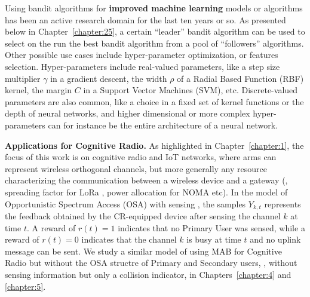    Using bandit algorithms for \textbf{improved machine learning} models or algorithms has been an active research domain for the last ten years or so.
    As presented below in Chapter~\ref{chapter:25}, a certain ``leader'' bandit algorithm can be used to select on the run the best bandit algorithm from a pool of ``followers'' algorithms.
    Other possible use cases include hyper-parameter optimization, or features selection.
    Hyper-parameters include real-valued parameters,
    like a step size multiplier $\gamma$ in a gradient descent,
    the width $\rho$ of a Radial Based Function (RBF) kernel,
    the margin $C$ in a Support Vector Machines (SVM), etc.
    Discrete-valued parameters are also common, like a choice in a fixed set of kernel functions or the depth of neural networks,
    and higher dimensional or more complex hyper-parameters can for instance be the entire architecture of a neural network.


\textbf{Applications for Cognitive Radio.}
%
As highlighted in Chapter~\ref{chapter:1},
the focus of this work is on cognitive radio and IoT networks, where arms can represent wireless orthogonal channels, but more generally any resource characterizing the communication between a wireless device and a gateway (\eg, spreading factor for LoRa \cite{KerkoucheAlami18}, power allocation for NOMA etc).
%
In the model of Opportunistic Spectrum Access (OSA) with sensing \cite{Jouini09,Jouini10}, the samples $Y_{k,t}$ represents the feedback obtained by the CR-equipped device after sensing the channel $k$ at time $t$.
A reward of $r(t) = 1$ indicates that no Primary User was sensed, while a reward of $r(t)=0$ indicates that the channel $k$ is busy at time $t$ and no uplink message can be sent.
%
We study a similar model of using MAB for Cognitive Radio but without the OSA structre of Primary and Secondary users, \ie, without sensing information but only a collision indicator, in Chapters~\ref{chapter:4} and \ref{chapter:5}.


